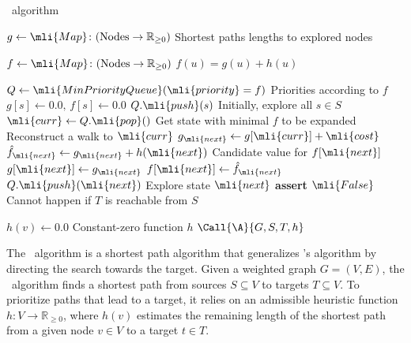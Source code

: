 \begin{algorithm}[t]
	\caption{\A~algorithm} \label{alg:astar}
	\begin{algorithmic}[1]
		\State $g \gets \mli{Map}\colon (\text{Nodes} \to \mathbb{R}_{\geq 0})$
		\Comment Shortest paths lengths to explored nodes

		\State $f \gets \mli{Map}\colon (\text{Nodes} \to \mathbb{R}_{\geq 0})$
		\Comment $f(u)=g(u)+h(u)$ 

		\State $Q \gets \mli{MinPriorityQueue}(\mli{priority}=f)$ 
		\Comment Priorities according to $f$
			\State $g[s] \gets 0.0,\, f[s] \gets 0.0$
			\State $Q.\mli{push}(s)$
			\Comment Initially, explore all $s \in S$
		\EndFor
			\State $\mli{curr} \gets Q.\mli{pop}()$
			\Comment Get state with minimal $f$ to be expanded
				\State \Return {}
				\Comment Reconstruct a walk to $\mli{curr}$
			\EndIf
			\State $g_\mli{next} \gets g[\mli{curr}] + \mli{cost}$
			\State $\hat{f}_\mli{next} \gets g_\mli{next} + h(\mli{next})$
				\Comment Candidate value for $f[\mli{next}]$
					\State $g[\mli{next}] \gets g_\mli{next}$		
					\State $f[\mli{next}] \gets \hat{f}_\mli{next}$		
					\State $Q.\mli{push}(\mli{next})$
					\Comment Explore state $\mli{next}$
				\EndIf
		\EndFor
		\EndWhile
		\State \textbf{assert} $\mli{False}$
		\Comment Cannot happen if $T$ is reachable from $S$
		\EndFunction

		\Statex

			\State $h(v) \gets 0.0$
			\Comment Constant-zero function $h$
			\State $\Call{\A}{G,S,T,h}$
		\EndFunction
	\end{algorithmic}
\end{algorithm}


%
The \A~algorithm is a shortest path algorithm that generalizes \dijkstra's
algorithm by directing the search towards the target.
Given a weighted graph $G=(V,E)$, the \A~algorithm finds a shortest path from
sources $S \subseteq V$ to targets $T \subseteq V$.
%
To prioritize paths that lead to a target, it relies on an admissible heuristic
function $h \colon V \to \mathbb{R}_{\geq 0}$, where $h(v)$ estimates the
remaining length of the shortest path from a given node $v \in V$ to a target
$t \in T$.


